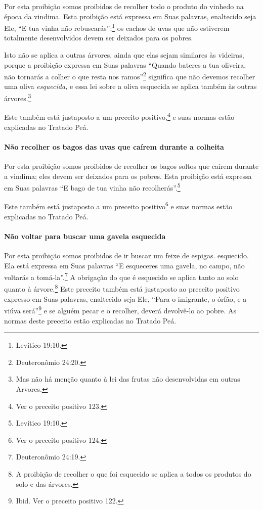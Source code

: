 Por esta proibição somos proibidos de recolher todo o produto do vinhedo
na época da vindima. Esta proibição está expressa em Suas palavras,
enaltecido seja Ele, ``E tua vinha não rebuscarás'';\footnote{Levítico 19:10.} os
cachos de uvas que não estiverem totalmente desenvolvidos devem ser
deixados para os pobres.

Isto não se aplica a outras árvores, ainda que elas sejam similares às
videiras, porque a proibição expressa em Suas palavras ``Quando bateres
a tua oliveira, não tornarás a colher o que resta nos ramos''\footnote{Deuteronômio 24:20.} significa que não devemos recolher uma oliva
\emph{esquecida,} e essa lei sobre a oliva esquecida se aplica também
às outras árvores.\footnote{Mas não há menção quanto à lei das frutas não desenvolvidas em outras Arvores.}

Este também está justaposto a um preceito
positivo,\footnote{Ver o preceito positivo 123.} e suas normas estão explicadas no
Tratado Peá.

\paragraph{Não recolher os bagos das uvas que caírem durante a colheita}

Por esta proibição somos proibidos de recolher os bagos soltos que
caírem durante a vindima; eles devem ser deixados para os pobres. Esta
proibição está expressa em Suas palavras ``E bago de tua vinha não
recolherás''.\footnote{Levítico 19:10.}

Este também está justaposto a um preceito positivo\footnote{Ver o preceito positivo 124.}
e suas normas estão explicadas no Tratado Peá.

\paragraph{Não voltar para buscar uma gavela esquecida}

Por esta proibição somos proibidos de ir buscar um feixe de espigas.
esquecido. Ela está expressa em Suas palavras ``E esqueceres uma gavela,
no campo, não voltarás a tomá-la''.\footnote{Deuteronômio 24:19.} A obrigação do
que é esquecido se aplica tanto ao solo quanto à
árvore.\footnote{A proibição de recolher o que foi esquecido se aplica a todos os
  produtos do solo e das árvores.} Este preceito também está justaposto ao
preceito positivo expresso em Suas palavras, enaltecido seja Ele, ``Para
o imigrante, o órfão, e a viúva será''\footnote{Ibid. Ver o preceito positivo 122.} e
se alguém pecar e o recolher, deverá devolvê-lo ao pobre. As normas
deste preceito estão explicadas no Tratado Peá.

